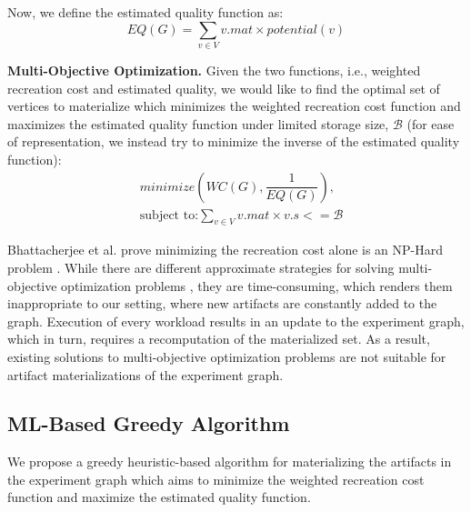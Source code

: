 Now, we define the estimated quality function as:
\[
EQ(G) =  \sum\limits_{v \in V}  v.mat \times potential(v)
\]

\textbf{Multi-Objective Optimization.}
Given the two functions, i.e., weighted recreation cost and estimated quality, we would like to find the optimal set of vertices to materialize which minimizes the weighted recreation cost function and maximizes the estimated quality function under limited storage size, $\mathcal{B}$ (for ease of representation, we instead try to minimize the inverse of the estimated quality function):
\begin{equation}
\begin{split}
& minimize(WC(G), \dfrac{1}{EQ(G)}), \\
& \text{subject to:} \sum\limits_{v \in V} v.mat \times v.s <= \mathcal{B}
\end{split}
\end{equation}

Bhattacherjee et al. prove minimizing the recreation cost alone is an NP-Hard problem \cite{bhattacherjee2015principles}.
While there are different approximate strategies for solving multi-objective optimization problems \cite{coello2007evolutionary}, they are time-consuming, which renders them inappropriate to our setting, where new artifacts are constantly added to the graph.
Execution of every workload results in an update to the experiment graph, which in turn, requires a recomputation of the materialized set.
As a result, existing solutions to multi-objective optimization problems are not suitable for artifact materializations of the experiment graph.

\subsection{ML-Based Greedy Algorithm}\label{subsec-ml-based-materialization}
We propose a greedy heuristic-based algorithm for materializing the artifacts in the experiment graph which aims to minimize the weighted recreation cost function and maximize the estimated quality function.

